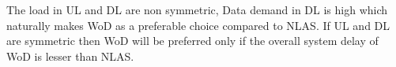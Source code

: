 \documentclass[conference]{IEEEtran}
\begin{document}
The load in UL and DL are non symmetric, Data demand in DL is high which naturally makes WoD as a preferable choice compared to NLAS. If UL and DL are symmetric then WoD will be preferred only if the overall system delay of WoD is lesser than NLAS.
%
%
%
\end{document}
